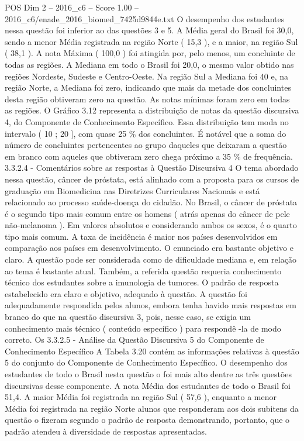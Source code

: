 \begin{textsample}{POS Dim 2 – 2016\_c6 – Score 1.00 – 2016\_c6/enade\_2016\_biomed\_7425d9844e.txt}
O desempenho dos estudantes nessa questão foi inferior ao das questões 3 e 5.
A Média geral do Brasil foi 30,0, sendo a menor Média registrada na região Norte ( 15,3 ), e a maior, na região Sul ( 38,1 ).
A nota Máxima ( 100,0 ) foi atingida por, pelo menos, um concluinte de todas as regiões.
A Mediana em todo o Brasil foi 20,0, o mesmo valor obtido nas regiões Nordeste, Sudeste e Centro-Oeste.
Na região Sul a Mediana foi 40 e, na região Norte, a Mediana foi zero, indicando que mais da metade dos concluintes desta região obtiveram zero na questão.
As notas mínimas foram zero em todas as regiões.
O Gráfico 3.12 representa a distribuição de notas da questão discursiva 4, do Componente de Conhecimento Específico.
Essa distribuição tem moda no intervalo ( 10 ; 20 ], com quase 25 \% dos concluintes.
É notável que a soma do número de concluintes pertencentes ao grupo daqueles que deixaram a questão em branco com aqueles que obtiveram zero chega próximo a 35 \% de frequência. 3.3.2.4 - Comentários sobre as respostas à Questão Discursiva 4 O tema abordado nessa questão, câncer de próstata, está alinhado com a proposta para os cursos de graduação em Biomedicina nas Diretrizes Curriculares Nacionais e está relacionado ao processo saúde-doença do cidadão.
No Brasil, o câncer de próstata é o segundo tipo mais comum entre os homens ( atrás apenas do câncer de pele não-melanoma ).
Em valores absolutos e considerando ambos os sexos, é o quarto tipo mais comum.
A taxa de incidência é maior nos países desenvolvidos em comparação aos países em desenvolvimento.
O enunciado era bastante objetivo e claro.
A questão pode ser considerada como de dificuldade mediana e, em relação ao tema é bastante atual.
Também, a referida questão requeria conhecimento técnico dos estudantes sobre a imunologia de tumores.
O padrão de resposta estabelecido era claro e objetivo, adequado à questão.
A questão foi adequadamente respondida pelos alunos, embora tenha havido mais respostas em branco do que na questão discursiva 3, pois, nesse caso, se exigia um conhecimento mais técnico ( conteúdo específico ) para respondê -la de modo correto.
Os 3.3.2.5 - Análise da Questão Discursiva 5 do Componente de Conhecimento Específico A Tabela 3.20 contém as informações relativas à questão 5 do conjunto do Componente de Conhecimento Específico.
O desempenho dos estudantes de todo o Brasil nesta questão o foi mais alto dentre as três questões discursivas desse componente.
A nota Média dos estudantes de todo o Brasil foi 51,4.
A maior Média foi registrada na região Sul ( 57,6 ), enquanto a menor Média foi registrada na região Norte alunos que responderam aos dois subitens da questão o fizeram segundo o padrão de resposta demonstrando, portanto, que o padrão atendeu à diversidade de respostas apresentadas.

\end{textsample}

